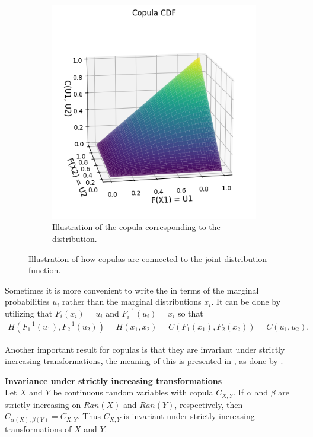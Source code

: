 \begin{figure}
\begin{subfigure}[t]{0.45\linewidth}
        \includegraphics[width=\linewidth]{3Theory/pictures/BivariateCopula.png}
        \caption{Illustration of the copula corresponding to the distribution.}
    \end{subfigure}
    \caption{Illustration of how copulas are connected to the joint distribution function.}
    \label{fig:CDFtoCopula}
\end{figure}


Sometimes it is more convenient to write the  in terms of the marginal probabilities $u_i$ rather than the marginal distributions $x_i$. It can be done by utilizing that $F_i(x_i) = u_i$ and $F_i^{-1}(u_i)= x_i$ so that 
\begin{align*}
    H(F_1^{-1}(u_1),F_2^{-1}(u_2))=H(x_1,x_2) = C(F_1(x_1), F_2(x_2))= C(u_1, u_2).
\end{align*}

Another important result for copulas is that they are invariant under strictly increasing transformations, the meaning of this is presented in , as done by \citet[p.~25]{Nelsen2006}.

\begin{theorem}\label{the:TranslationInvariance}
        \textbf{Invariance under strictly increasing transformations}\\
        Let $X$ and $Y$ be continuous random variables with copula $C_{X, Y}$. If $\alpha$ and $\beta$ are strictly increasing on $Ran(X)$ and $Ran(Y)$, respectively, then $C_{\alpha(X),\beta(Y)}  = C_{X,Y}$. Thus $C_{X, Y}$ is invariant under strictly increasing transformations of $X$ and $Y$.
\end{theorem}

